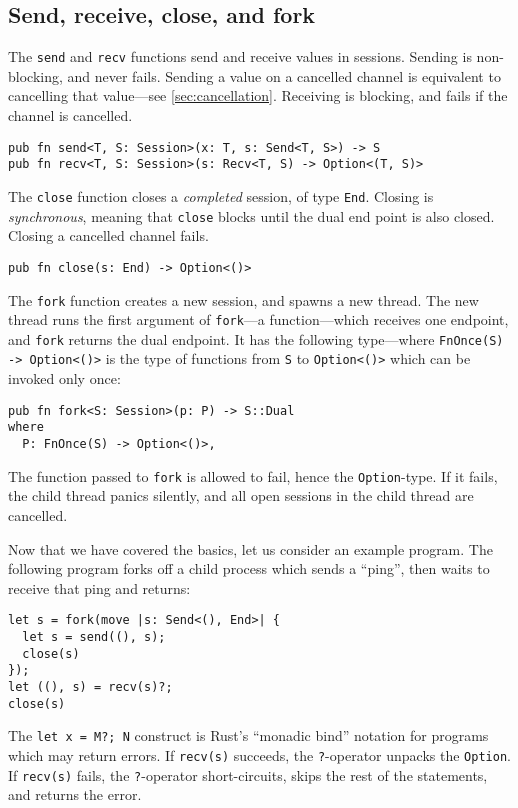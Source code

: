 \documentclass[copyright,creativecommons]{eptcs}
\begin{document}
\subsection{Send, receive, close, and fork}\label{sec:basics}
The \lstinline{send} and \lstinline{recv} functions send and receive values in sessions. Sending is non-blocking, and never fails. Sending a value on a cancelled channel is equivalent to cancelling that value---see \cref{sec:cancellation}. Receiving is blocking, and fails if the channel is cancelled.
\begin{lstlisting}
pub fn send<T, S: Session>(x: T, s: Send<T, S>) -> S
pub fn recv<T, S: Session>(s: Recv<T, S) -> Option<(T, S)>
\end{lstlisting}
The \lstinline{close} function closes a \emph{completed} session, \ie of type \lstinline{End}. Closing is \emph{synchronous}, meaning that \lstinline{close} blocks until the dual end point is also closed. Closing a cancelled channel fails.
\begin{lstlisting}
pub fn close(s: End) -> Option<()>
\end{lstlisting}
The \lstinline{fork} function creates a new session, and spawns a new thread. The new thread runs the first argument of \lstinline{fork}---a function---which receives one endpoint, and \lstinline{fork} returns the dual endpoint. It has the following type---where \lstinline{FnOnce(S) -> Option<()>} is the type of functions from \lstinline{S} to \lstinline{Option<()>} which can be invoked only once:
\begin{lstlisting}
pub fn fork<S: Session>(p: P) -> S::Dual
where
  P: FnOnce(S) -> Option<()>,
\end{lstlisting}
The function passed to \lstinline{fork} is allowed to fail, hence the \lstinline{Option}-type. If it fails, the child thread panics silently, and all open sessions in the child thread are cancelled.

Now that we have covered the basics, let us consider an example program. The following program forks off a child process which sends a ``ping'', then waits to receive that ping and returns:
\begin{lstlisting}
let s = fork(move |s: Send<(), End>| {
  let s = send((), s);
  close(s)
});
let ((), s) = recv(s)?;
close(s)
\end{lstlisting}
The \lstinline{let x = M?; N} construct is Rust's ``monadic bind'' notation for programs which may return errors. If \lstinline{recv(s)} succeeds, the \lstinline{?}-operator unpacks the \lstinline{Option}. If \lstinline{recv(s)} fails, the \lstinline{?}-operator short-circuits, skips the rest of the statements, and returns the error.
\end{document}
